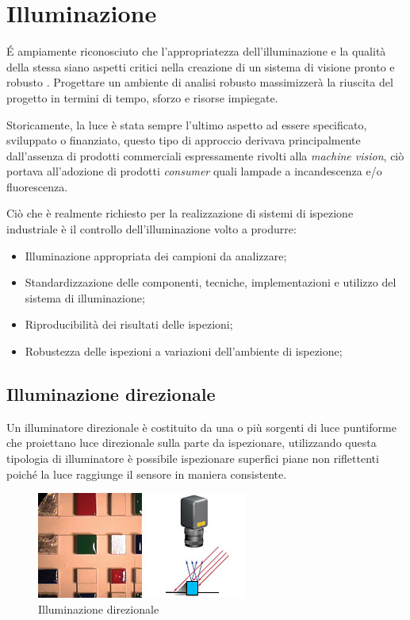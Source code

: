 \section{Illuminazione}

 \'{E} ampiamente riconosciuto che l'appropriatezza
dell'illuminazione e la qualità della stessa siano aspetti critici nella
creazione di un sistema di visione pronto e robusto \cite{doi:10.1117/12.467381}. Progettare un ambiente di
analisi robusto massimizzerà la riuscita del progetto in termini di tempo,
sforzo e risorse impiegate.

Storicamente, la luce è stata sempre l'ultimo aspetto ad essere specificato,
sviluppato o finanziato, questo tipo di approccio derivava principalmente
dall'assenza di prodotti commerciali espressamente rivolti alla \emph{machine
vision}, ciò portava all'adozione di prodotti \emph{consumer} quali lampade a
incandescenza e/o fluorescenza.

Ciò che è realmente richiesto per la realizzazione di sistemi di ispezione
industriale è il controllo dell'illuminazione volto a produrre:

\begin{itemize}
	\item Illuminazione appropriata dei campioni da analizzare;
	\item Standardizzazione delle componenti, tecniche, implementazioni e utilizzo del sistema di illuminazione;
	\item Riproducibilità dei risultati delle ispezioni;
	\item Robustezza delle ispezioni a variazioni dell'ambiente di ispezione;
\end{itemize} 

\subsection{Illuminazione direzionale}

Un illuminatore direzionale è costituito da una o più 
sorgenti di luce puntiforme che proiettano luce direzionale 
sulla parte da ispezionare, utilizzando questa tipologia di 
illuminatore è possibile ispezionare superfici piane non 
riflettenti poiché la luce raggiunge il sensore in maniera consistente. 

\begin{figure}
\centering
\includegraphics[width=.3\textwidth]{img/illuminazione-direzionale.jpg}
\caption{Illuminazione direzionale}\label{fig:illuminazione-direzionale}
\end{figure}

